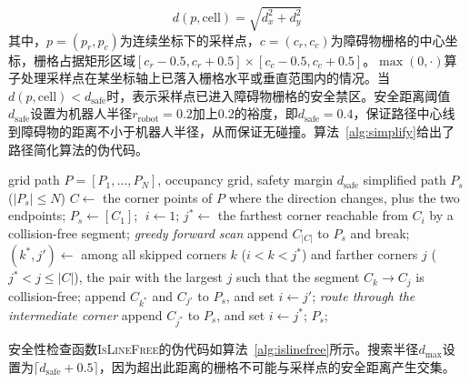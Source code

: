 \documentclass[lettersize,journal]{IEEEtran}
\begin{document}
\begin{equation}
d(p, \mathrm{cell}) = \sqrt{d_x^2 + d_y^2}
\label{eq:dist}
\end{equation}
其中，$p = (p_r, p_c)$为连续坐标下的采样点，$c = (c_r, c_c)$为障碍物栅格的中心坐标，栅格占据矩形区域$[c_r - 0.5, c_r + 0.5] \times [c_c - 0.5, c_c + 0.5]$。$\max(0, \cdot)$算子处理采样点在某坐标轴上已落入栅格水平或垂直范围内的情况。当$d(p, \mathrm{cell}) < d_{\mathrm{safe}}$时，表示采样点已进入障碍物栅格的安全禁区。安全距离阈值$d_{\mathrm{safe}}$设置为机器人半径$r_{\mathrm{robot}} = 0.2$加上$0.2$的裕度，即$d_{\mathrm{safe}} = 0.4$，保证路径中心线到障碍物的距离不小于机器人半径，从而保证无碰撞。算法~\ref{alg:simplify}给出了路径简化算法的伪代码。
\begin{algorithm}[!t]
\caption{Safety-distance-aware path simplification}
\label{alg:simplify}
\begin{algorithmic}[1]
\REQUIRE grid path $P = [P_1, \ldots, P_N]$, occupancy grid, safety margin $d_{\mathrm{safe}}$
\ENSURE simplified path $P_s$ ($|P_s| \leq N$)
\STATE $C \gets$ the corner points of $P$ where the direction changes, plus the two endpoints;
\STATE $P_s \gets [C_1]$; $\; i \gets 1$;
\STATE $j^{*} \gets$ the farthest corner reachable from $C_i$ by a collision-free segment; \quad\textit{greedy forward scan}
\STATE append $C_{|C|}$ to $P_s$ and break;
\ENDIF
\STATE $(k^{*}, j') \gets$ among all skipped corners $k$ ($i < k < j^{*}$) and farther corners $j$ ($j^{*} < j \leq |C|$), the pair with the largest $j$ such that the segment $C_k \to C_j$ is collision-free;
\STATE append $C_{k^{*}}$ and $C_{j'}$ to $P_s$, and set $i \gets j'$; \quad\textit{route through the intermediate corner}
\ELSE
\STATE append $C_{j^{*}}$ to $P_s$, and set $i \gets j^{*}$;
\ENDIF
\ENDWHILE
\STATE \RETURN $P_s$;
\end{algorithmic}
\end{algorithm}
安全性检查函数\textsc{IsLineFree}的伪代码如算法~\ref{alg:islinefree}所示。搜索半径$d_{\max}$设置为$\lceil d_{\mathrm{safe}} + 0.5 \rceil$，因为超出此距离的栅格不可能与采样点的安全距离产生交集。
\end{document}

